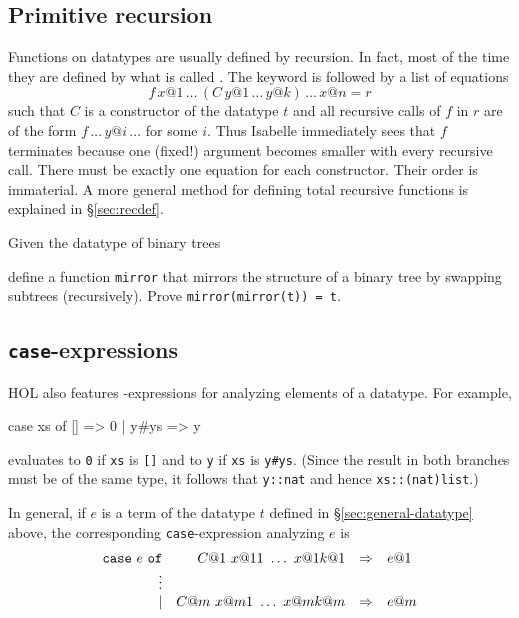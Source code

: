 \subsection{Primitive recursion}

Functions on datatypes are usually defined by recursion. In fact, most of the
time they are defined by what is called .
The keyword  is followed by a list of equations
\[ f \, x@1 \, \dots \, (C \, y@1 \, \dots \, y@k)\, \dots \, x@n = r \]
such that $C$ is a constructor of the datatype $t$ and all recursive calls of
$f$ in $r$ are of the form $f \, \dots \, y@i \, \dots$ for some $i$. Thus
Isabelle immediately sees that $f$ terminates because one (fixed!) argument
becomes smaller with every recursive call. There must be exactly one equation
for each constructor.  Their order is immaterial.
A more general method for defining total recursive functions is explained in
\S\ref{sec:recdef}.

\begin{exercise}
Given the datatype of binary trees
\begin{ttbox}
\end{ttbox}
define a function \texttt{mirror} that mirrors the structure of a binary tree
by swapping subtrees (recursively). Prove \texttt{mirror(mirror(t)) = t}.
\end{exercise}

\subsection{\texttt{case}-expressions}
\label{sec:case-expressions}

HOL also features -expressions for analyzing elements of a
datatype. For example,
\begin{ttbox}
case xs of [] => 0 | y#ys => y
\end{ttbox}
evaluates to \texttt{0} if \texttt{xs} is \texttt{[]} and to \texttt{y} if 
\texttt{xs} is \texttt{y\#ys}. (Since the result in both branches must be of
the same type, it follows that \texttt{y::nat} and hence
\texttt{xs::(nat)list}.)

In general, if $e$ is a term of the datatype $t$ defined in
\S\ref{sec:general-datatype} above, the corresponding
\texttt{case}-expression analyzing $e$ is
\[
\begin{array}{rrcl}
\mbox{\tt case}~e~\mbox{\tt of} & C@1~x@{11}~\dots~x@{1k@1} & \Rightarrow & e@1 \\
                           \vdots \\
                           \mid & C@m~x@{m1}~\dots~x@{mk@m} & \Rightarrow & e@m
\end{array}
\]

